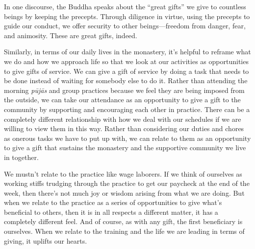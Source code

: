 
In one discourse, the Buddha speaks about the ``great gifts'' we give 
to countless beings by keeping the precepts. Through diligence in 
virtue, using the precepts to guide our conduct, we offer security to 
other beings---freedom from danger, fear, and animosity. These are 
great gifts, indeed.

Similarly, in terms of our daily lives in the monastery, it's helpful 
to reframe what we do and how we approach life so that we look at our 
activities as opportunities to give gifts of service. We can give a 
gift of service by doing a task that needs to be done instead of 
waiting for somebody else to do it. Rather than attending the morning 
\emph{pūjās} and group practices because we feel they are being 
imposed from the outside, we can take our attendance as an opportunity 
to give a gift to the community by supporting and encouraging each 
other in practice. There can be a completely different relationship 
with how we deal with our schedules if we are willing to view them in 
this way. Rather than considering our duties and chores as onerous 
tasks we have to put up with, we can relate to them as an opportunity 
to give a gift that sustains the monastery and the supportive community 
we live in together.

We mustn't relate to the practice like wage laborers. If we think of 
ourselves as working stiffs trudging through the practice to get our 
paycheck at the end of the week, then there's not much joy or wisdom 
arising from what we are doing. But when we relate to the practice as a 
series of opportunities to give what's beneficial to others, then it is 
in all respects a different matter, it has a completely different feel. 
And of course, as with any gift, the first beneficiary is ourselves. 
When we relate to the training and the life we are leading in terms of 
giving, it uplifts our hearts.

